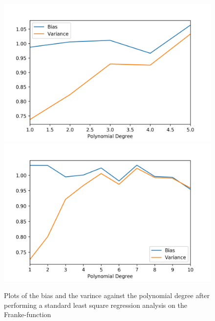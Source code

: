 \documentclass[a4paper,10pt,english]{article}
\begin{document}




\begin{figure}[H]
	\centering 
	\includegraphics[scale=0.63]{../franke_output/part_C_1.png}
	\includegraphics[scale=0.63]{../franke_output/part_C_1_highdeg.png}
	\caption{
		Plots of the bias and the varince against the polynomial degree after performing a standard least square regression analysis on the Franke-function
	}
	\label{part_c1}
\end{figure}
\end{document}

